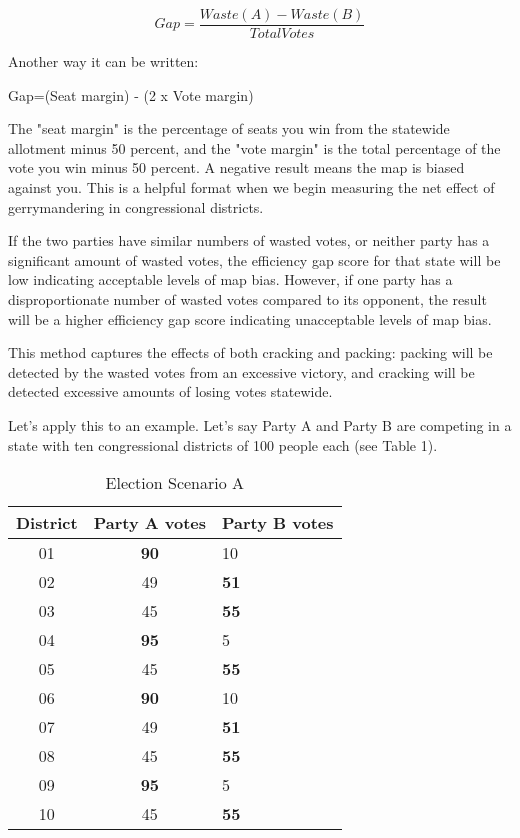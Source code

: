 \documentclass[sigconf]{acmart}
\begin{document}
\[Gap=\frac{Waste(A)-Waste(B)}{TotalVotes}\]

Another way it can be written:

\begin{center}
    Gap=(Seat margin) - (2 x Vote margin)
\end{center}

The "seat margin" is the percentage of seats you win from the statewide allotment minus 50 percent, and the "vote margin" is the total percentage of the vote you win minus 50 percent. A negative result means the map is biased against you.\cite{chicagoformula} This is a helpful format when we begin measuring the net effect of gerrymandering in congressional districts.

If the two parties have similar numbers of wasted votes, or neither party has a significant amount of wasted votes, the efficiency gap score for that state will be low indicating acceptable levels of map bias. However, if one party has a disproportionate number of wasted votes compared to its opponent, the result will be a higher efficiency gap score indicating unacceptable levels of map bias.

This method captures the effects of both cracking and packing: packing will be detected by the wasted votes from an excessive victory, and cracking will be detected excessive amounts of losing votes statewide.

Let's apply this to an example. Let's say Party A and Party B are competing in a state with ten congressional districts of 100 people each (see Table 1).

\begin{table}
\caption{Election Scenario A}
\label{tab:freq}
\begin{tabular}{ccl} 
 \hline
 District & Party A votes & Party B votes \\
 \hline
 01 & \textbf{90} & 10 \\
 \hline
 02 & 49 & \textbf{51} \\
 \hline
 03 & 45 & \textbf{55} \\
 \hline
 04 & \textbf{95} & 5 \\
 \hline
 05 & 45 & \textbf{55} \\
 \hline
 06 & \textbf{90} & 10 \\
 \hline
 07 & 49 & \textbf{51} \\
 \hline
 08 & 45 & \textbf{55} \\
 \hline
 09 & \textbf{95} & 5 \\
 \hline
 10 & 45 & \textbf{55} \\
 \hline
\end{tabular}
\end{table}
\end{document}

